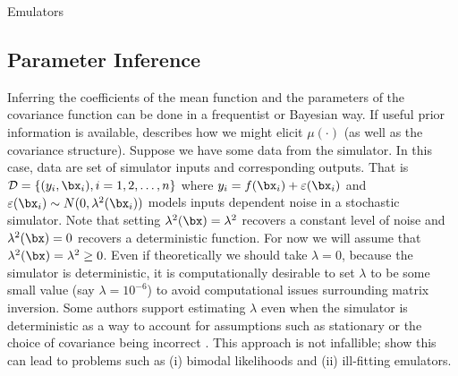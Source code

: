 \begin{chapter}{Emulators \label{Ch:Emulators}}
\subsection{Parameter Inference}
Inferring the coefficients of the mean function and the parameters of the covariance function can be done in a frequentist or Bayesian way. If useful prior information is available, \citet{Oakley2002} describes how we might elicit $\mu(\cdot)$ (as well as the covariance structure). Suppose we have some data from the simulator. In this case, data are set of simulator inputs and corresponding outputs. That is $\mathcal{D} = \{ (y_i, \bx_i), i = 1, 2, \ldots, n \} $ where $y_i = f(\bx_i) + \varepsilon(\bx_i)$ and $\varepsilon(\bx_i) \sim N(0, \lambda^2(\bx_i))$ models inputs dependent noise in a stochastic simulator. Note that setting $\lambda^2(\bx) = \lambda^2$ recovers a constant level of noise and  $\lambda^2(\bx) = 0$ recovers a deterministic function. For now we will assume that $\lambda^2(\bx) = \lambda^2 \geq 0$. Even if theoretically we should take $\lambda = 0$, because the simulator is deterministic, it is computationally desirable to set $\lambda$ to be some small value (say $\lambda = 10^{-6}$) to avoid computational issues surrounding matrix inversion. Some authors support estimating $\lambda$ even when the simulator is deterministic as a way to account for assumptions such as stationary or the choice of covariance being incorrect \citep{Gramacy12}. This approach is not infallible; \citet{Andrianakis2012} show this can lead to problems such as (i) bimodal likelihoods and (ii) ill-fitting emulators.


\end{chapter}
